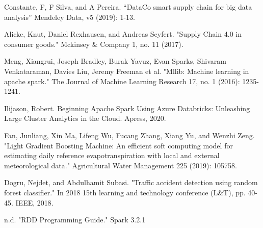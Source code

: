 \documentclass[journal,twoside,web]{ieeecolor}
\begin{document}
\begin{thebibliography}{00}

 Constante, F, F Silva, and A Pereira. “DataCo smart supply chain for big data analysis” Mendeley Data, v5 (2019): 1-13.

 Alicke, Knut, Daniel Rexhausen, and Andreas Seyfert. "Supply Chain 4.0 in consumer goods." Mckinsey & Company 1, no. 11 (2017).

 Meng, Xiangrui, Joseph Bradley, Burak Yavuz, Evan Sparks, Shivaram Venkataraman, Davies Liu, Jeremy Freeman et al. "Mllib: Machine learning in apache spark." The Journal of Machine Learning Research 17, no. 1 (2016): 1235-1241.

 Ilijason, Robert. Beginning Apache Spark Using Azure Databricks: Unleashing Large Cluster Analytics in the Cloud. Apress, 2020.

 Fan, Junliang, Xin Ma, Lifeng Wu, Fucang Zhang, Xiang Yu, and Wenzhi Zeng. "Light Gradient Boosting Machine: An efficient soft computing model for estimating daily reference evapotranspiration with local and external meteorological data." Agricultural Water Management 225 (2019): 105758.

 Dogru, Nejdet, and Abdulhamit Subasi. "Traffic accident detection using random forest classifier." In 2018 15th learning and technology conference (L&T), pp. 40-45. IEEE, 2018.

 n.d. "RDD Programming Guide." Spark 3.2.1


\end{thebibliography}
\end{document}
